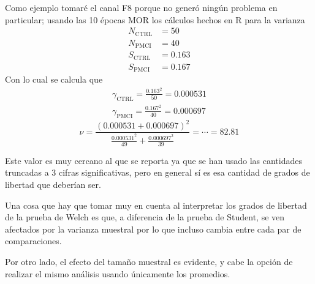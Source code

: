 \documentclass[10pt,a4paper]{article}
\begin{document}
Como ejemplo tomaré el canal F8 porque no generó ningún problema en particular;
usando las 10 épocas MOR  los cálculos hechos en R para la varianza
\begin{align*}
N_{\text{CTRL}} &= 50 \\
N_{\text{PMCI}} &= 40 \\
S_{\text{CTRL}} &= 0.163 \\
S_{\text{PMCI}} &= 0.167
\end{align*}
Con lo cual se calcula que
\begin{align*}
\gamma_{\text{CTRL}} = \frac{0.163^{2}}{50} = 0.000531 \\
\gamma_{\text{PMCI}} = \frac{0.167^{2}}{40} = 0.000697 
\end{align*}
$$
\nu = \frac{(0.000531+0.000697)^{2}}{\frac{0.000531^{2}}{49}+\frac{0.000697^{2}}{39}} = \cdots = 82.81
$$

Este valor es muy cercano al que se reporta ya que se han usado las cantidades truncadas a 3 cifras 
significativas, pero en general sí es esa cantidad de grados de libertad que deberían ser.

Una cosa que hay que tomar muy en cuenta al interpretar los grados de libertad de la prueba de Welch es 
que, a diferencia de la prueba de Student, se ven afectados por la varianza muestral por lo que
incluso cambia entre cada par de comparaciones.

Por otro lado, el efecto del tamaño muestral es evidente, y cabe la opción de realizar el mismo análisis
usando únicamente los promedios.
\end{document}
